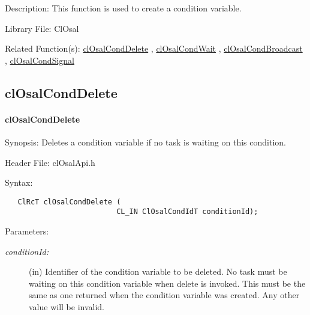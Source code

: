 \begin{Desc}
\item[Description:]This function is used to create a condition variable.\end{Desc}
\begin{Desc}
\item[Library File:]Cl\-Osal\end{Desc}
\begin{Desc}
\item[Related Function(s):]\hyperlink{pageosal119}{cl\-Osal\-Cond\-Delete} , \hyperlink{pageosal120}{cl\-Osal\-Cond\-Wait} , 
\hyperlink{pageosal121}{cl\-Osal\-Cond\-Broadcast} , \hyperlink{pageosal122}{cl\-Osal\-Cond\-Signal} \end{Desc}

\newpage
\subsection{clOsalCondDelete}
\hypertarget{pageosal119}{}\paragraph{cl\-Osal\-Cond\-Delete}\label{pageosal119}
\begin{Desc}
\item[Synopsis:]Deletes a condition variable if no task is waiting on this condition.\end{Desc}
\begin{Desc}
\item[Header File:]clOsalApi.h\end{Desc}
\begin{Desc}
\item[Syntax:]

\footnotesize\begin{verbatim}   ClRcT clOsalCondDelete (
                          CL_IN ClOsalCondIdT conditionId);
\end{verbatim}
\normalsize
\end{Desc}
\begin{Desc}
\item[Parameters:]
\begin{description}
\item[{\em condition\-Id:}](in) Identifier of the condition variable to be deleted. No task must be waiting on this condition variable when delete is invoked. This must be the same as one returned when the condition variable was created. Any other value will be invalid.\end{description}
\end{Desc}
